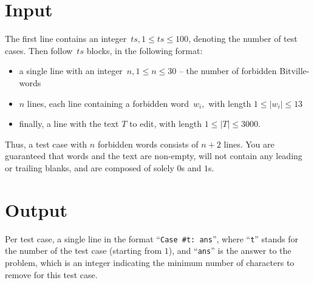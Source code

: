 \section*{Input}
The first line contains an integer~$ts, 1 \leq ts \leq 100$, denoting the number of test cases.
Then follow~$ts$ blocks, in the following format:
\begin{itemize}
  \item a single line with an integer~$n, 1\leq n \leq 30$ -- the number of forbidden Bitville-words
  \item $n$ lines, each line containing a forbidden word~$w_i,$ with length $1 \leq |w_i| \leq 13$ 
  \item finally, a line with the text $T$ to edit, with length $1 \leq |T| \leq 3000.$
\end{itemize}
Thus, a test case with $n$ forbidden words consists of $n+2$ lines. You are guaranteed that words and the text are non-empty, will not contain any leading or trailing blanks,
and are composed of solely $0$s and $1$s.

\section*{Output}
Per test case, a single line in the format ``{\texttt{Case \#t: ans}}'', where ``{\texttt{t}}'' stands for the number of the test case (starting from $1$), and ``{\texttt{ans}}'' is the answer to the problem, which is an integer indicating the minimum number of characters to remove for this test case.

